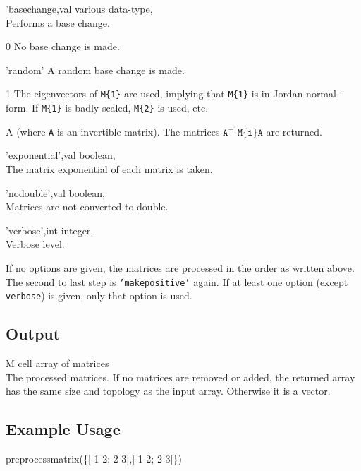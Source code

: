 \begin{param}
\item['basechange,val] various data-type, \\Performs a base change.
    \begin{param}
    \item[0] No base change is made.
    \item['random'] A random base change is made.
    \item[1] The eigenvectors of \texttt{M\{1\}} are used, implying that \texttt{M\{1\}} is in Jordan-normal-form. If \texttt{M\{1\}} is badly scaled, \texttt{M\{2\}} is used, etc.
    \item[A] (where \texttt{A} is an invertible matrix). The matrices $\texttt{A}^{-1}\texttt{M\{i\}}\texttt{A}$ are returned.
    \end{param}
\item['exponential',val] boolean, \\The matrix exponential of each matrix is taken. 
\item['nodouble',val] boolean, \\Matrices are not converted to double.
\item['verbose',int] integer, \\Verbose level.
\end{param}

If no options are given, the matrices are processed in the order as written above. The second to last step is \texttt{'makepositive'} again.
If at least one option (except \texttt{verbose}) is given, only that option is used.

\subsection*{Output}
\begin{param}
\item[M] cell array of matrices\\The processed matrices. If no matrices are removed or added, the returned array has the same size and topology as the input array. Otherwise it is a vector.
\end{param}

\subsection*{Example Usage}
\begin{param}
\item[{preprocessmatrix(\{[-1 2; 2 3],[-1 2; 2 3]\})}]
\end{param}



